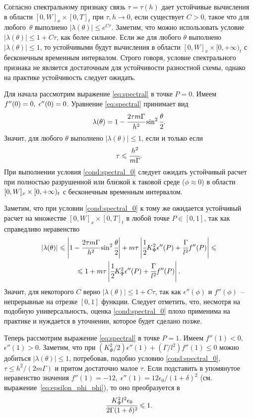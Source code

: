 Согласно спектральному признаку связь $\tau = \tau(h)$ дает устойчивые вычисления в области $[0, W]_x \times [0, T]_t$ при $\tau, h \to 0$, если существует $C > 0$, такое что для любого~$\theta$ выполнено $|\lambda(\theta)| \leqslant e^{C\tau}$. Заметим, что можно использовать условие $|\lambda(\theta)| \leqslant 1 + C\tau$, как более сильное. Если же для любого $\theta$ выполнено $|\lambda(\theta)| \leqslant 1$, то устойчивыми будут вычисления в области $[0, W]_x \times [0, +\infty)_t$ с бесконечным временным интервалом. Строго говоря, условие спектрального признака не является достаточным для устойчивости разностной схемы, однако на практике устойчивость следует ожидать.

Для начала рассмотрим выражение \eqref{eq:spectral} в точке $P = 0$. Имеем $f''(0) \hm = 0, \; \epsilon''(0) = 0$. Уравнение \eqref{eq:spectral} принимает вид
$$\lambda(\theta) = 1 - \cfrac{2 \tau m \Gamma}{h^2} \sin^2 \cfrac{\theta}{2} {\text{.}}$$
Значит, для любого $\theta$ выполнено $|\lambda(\theta)| \leqslant 1$, если и только если
\begin{equation}
	 \tau \leqslant \cfrac{h^2}{m \Gamma} {\text{.}}
	 \label{cond:spectral_0}
\end{equation}
При выполнении условия \eqref{cond:spectral_0} следует ожидать устойчивый расчет при полностью разрушенной или близкой к таковой среде ($\phi \approx 0$) в области $[0, W]_x \hm \times [0, +\infty)_t$ с бесконечным временным интервалом.

Заметим, что при условии \eqref{cond:spectral_0} к тому же ожидается устойчивый расчет на множестве $[0, W]_x \times [0, T]_t$ в любой точке $P \in [0, 1]$, так как справедливо неравенство
\begin{multline*}
	|\lambda(\theta)| \leqslant \left| 1 - \cfrac{2 \tau m \Gamma}{h^2} \sin^2 \cfrac{\theta}{2} \right| + m \tau \left| \cfrac{1}{2} K_\Phi^2 \epsilon''(P) + \cfrac{\Gamma}{l^2} f''(P) \right| \leqslant \\ \leqslant 1 + m \tau \left| \cfrac{1}{2} K_\Phi^2 \epsilon''(P) + \cfrac{\Gamma}{l^2} f''(P) \right| {\text{.}}
\end{multline*}
Значит, для некоторого $C$ верно $|\lambda(\theta)| \leqslant 1 + C \tau$, так как $\epsilon''(\phi)$ и $f''(\phi)$~-- непрерывные на отрезке $[0, 1]$ функции. Следует отметить, что, несмотря на подобную универсальность, оценка \eqref{cond:spectral_0} плохо применима на практике и нуждается в уточнении, которое будет сделано позже.

Теперь рассмотрим выражение \eqref{eq:spectral} в точке $P = 1$. Имеем $f''(1) < 0,$ $\epsilon''(1) > 0$. Заметим, что при $(K_\Phi^2 / 2) \epsilon''(1) + (\Gamma / l^2) f''(1) \leqslant 0$ можно добиться $|\lambda(\theta)| \leqslant 1$, потребовав, подобно условию \eqref{cond:spectral_0}, $\tau \leqslant h^2 / (2m \Gamma)$ и притом достаточно малое $\tau$. Если подставить в упомянутое неравенство значения $f''(1) = -12, \; \epsilon''(1) = 12 \epsilon_0 / (1 + \delta)^2$ (см. выражение~\eqref{eq:epsilon_phi_phi}), то оно преобразуется в
\begin{equation}
	\cfrac{K_\Phi^2 l^2 \epsilon_0}{2 \Gamma (1 + \delta)^2} \leqslant 1 {\text{.}}
	\label{cond:spectral_possible_1}
\end{equation}

